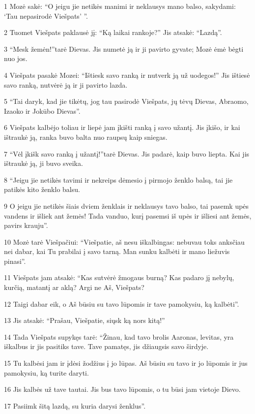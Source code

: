 \par 1 Mozė sakė: “O jeigu jie netikės manimi ir neklausys mano balso, sakydami: ‘Tau nepasirodė Viešpats’ ”. 
\par 2 Tuomet Viešpats paklausė jį: “Ką laikai rankoje?” Jis atsakė: “Lazdą”. 
\par 3 “Mesk žemėn!”­tarė Dievas. Jis numetė ją ir ji pavirto gyvate; Mozė ėmė bėgti nuo jos. 
\par 4 Viešpats pasakė Mozei: “Ištiesk savo ranką ir nutverk ją už uodegos!” Jis ištiesė savo ranką, nutvėrė ją ir ji pavirto lazda. 
\par 5 “Tai daryk, kad jie tikėtų, jog tau pasirodė Viešpats, jų tėvų Dievas, Abraomo, Izaoko ir Jokūbo Dievas”. 
\par 6 Viešpats kalbėjo toliau ir liepė jam įkišti ranką į savo užantį. Jis įkišo, ir kai ištraukė ją, ranka buvo balta nuo raupsų kaip sniegas. 
\par 7 “Vėl įkišk savo ranką į užantį!”­tarė Dievas. Jis padarė, kaip buvo liepta. Kai jis ištraukė ją, ji buvo sveika. 
\par 8 “Jeigu jie netikės tavimi ir nekreips dėmesio į pirmojo ženklo balsą, tai jie patikės kito ženklo balsu. 
\par 9 O jeigu jie netikės šiais dviem ženklais ir neklausys tavo balso, tai pasemk upės vandens ir išliek ant žemės! Tada vanduo, kurį pasemsi iš upės ir išliesi ant žemės, pavirs krauju”. 
\par 10 Mozė tarė Viešpačiui: “Viešpatie, aš nesu iškalbingas: nebuvau toks anksčiau nei dabar, kai Tu prabilai į savo tarną. Man sunku kalbėti ir mano liežuvis pinasi”. 
\par 11 Viešpats jam atsakė: “Kas sutvėrė žmogaus burną? Kas padaro jį nebylų, kurčią, matantį ar aklą? Argi ne Aš, Viešpats? 
\par 12 Taigi dabar eik, o Aš būsiu su tavo lūpomis ir tave pamokysiu, ką kalbėti”. 
\par 13 Jis atsakė: “Prašau, Viešpatie, siųsk ką nors kitą!” 
\par 14 Tada Viešpats supykęs tarė: “Žinau, kad tavo brolis Aaronas, levitas, yra iškalbus ir jis pasitiks tave. Tave pamatęs, jis džiaugsis savo širdyje. 
\par 15 Tu kalbėsi jam ir įdėsi žodžius į jo lūpas. Aš būsiu su tavo ir jo lūpomis ir jus pamokysiu, ką turite daryti. 
\par 16 Jis kalbės už tave tautai. Jis bus tavo lūpomis, o tu būsi jam vietoje Dievo. 
\par 17 Pasiimk šitą lazdą, su kuria darysi ženklus”. 
